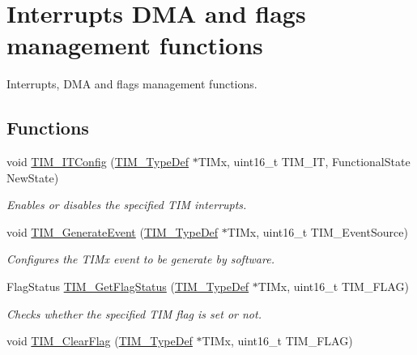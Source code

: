 \hypertarget{group___t_i_m___group5}{}\section{Interrupts D\+MA and flags management functions}
\label{group___t_i_m___group5}


Interrupts, D\+MA and flags management functions.  


\subsection*{Functions}
\begin{DoxyCompactItemize}
\item 
void \hyperlink{group___t_i_m___group5_ga70e3d6c09d55ee69002e154c85cd40e4}{T\+I\+M\+\_\+\+I\+T\+Config} (\hyperlink{struct_t_i_m___type_def}{T\+I\+M\+\_\+\+Type\+Def} $\ast$T\+I\+Mx, uint16\+\_\+t T\+I\+M\+\_\+\+IT, Functional\+State New\+State)
\begin{DoxyCompactList}\small\item\em Enables or disables the specified T\+IM interrupts. \end{DoxyCompactList}\item 
void \hyperlink{group___t_i_m___group5_ga38bd4ffda920dd4f7655a0a2c6100a6e}{T\+I\+M\+\_\+\+Generate\+Event} (\hyperlink{struct_t_i_m___type_def}{T\+I\+M\+\_\+\+Type\+Def} $\ast$T\+I\+Mx, uint16\+\_\+t T\+I\+M\+\_\+\+Event\+Source)
\begin{DoxyCompactList}\small\item\em Configures the T\+I\+Mx event to be generate by software. \end{DoxyCompactList}\item 
Flag\+Status \hyperlink{group___t_i_m___group5_ga0adcbbd5e838ec8642e7a9b80075f41f}{T\+I\+M\+\_\+\+Get\+Flag\+Status} (\hyperlink{struct_t_i_m___type_def}{T\+I\+M\+\_\+\+Type\+Def} $\ast$T\+I\+Mx, uint16\+\_\+t T\+I\+M\+\_\+\+F\+L\+AG)
\begin{DoxyCompactList}\small\item\em Checks whether the specified T\+IM flag is set or not. \end{DoxyCompactList}\item 
void \hyperlink{group___t_i_m___group5_ga46568c7b254941dc53e785342d60baf3}{T\+I\+M\+\_\+\+Clear\+Flag} (\hyperlink{struct_t_i_m___type_def}{T\+I\+M\+\_\+\+Type\+Def} $\ast$T\+I\+Mx, uint16\+\_\+t T\+I\+M\+\_\+\+F\+L\+AG)

\end{DoxyCompactItemize}
